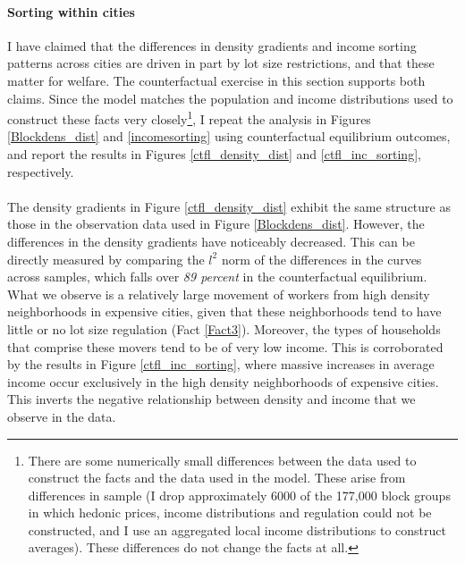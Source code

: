 \documentclass[]{article}
\begin{document}
\paragraph*{Sorting within cities}  I have claimed that the differences in density gradients and income sorting patterns across cities are driven in part by lot size restrictions, and that these matter for welfare. The counterfactual exercise in this section supports both claims. Since the model matches the population and income distributions used to construct these facts very closely\footnote{There are some numerically small differences between the data used to construct the facts and the data used in the model. These arise from differences in sample (I drop approximately 6000 of the 177,000 block groups in which hedonic prices, income distributions and regulation could not be constructed, and I use an aggregated local income distributions to construct averages). These differences do not change the facts at all.}, I repeat the analysis in Figures \ref{Blockdens_dist} and \ref{incomesorting} using counterfactual equilibrium outcomes, and report the results in Figures \ref{ctfl_density_dist} and \ref{ctfl_inc_sorting}, respectively.

\paragraph*{} 
The density gradients in Figure \ref{ctfl_density_dist} exhibit the same structure as those in the observation data used in Figure \ref{Blockdens_dist}. However, the differences in the density gradients have noticeably decreased. This can be directly measured by comparing the $l^{2}$ norm of the differences in the curves across samples, which falls over \textit{89 percent} in the counterfactual equilibrium. What we observe is a relatively large movement of workers from high density neighborhoods in expensive cities, given that these neighborhoods tend to have little or no lot size regulation (Fact \ref{Fact3}). Moreover, the types of households that comprise these movers tend to be of very low income. This is corroborated by the results in Figure \ref{ctfl_inc_sorting}, where  massive increases in average income occur exclusively in the high density neighborhoods of expensive cities. This inverts the negative relationship between density and income that we observe in the data. 
\end{document}

